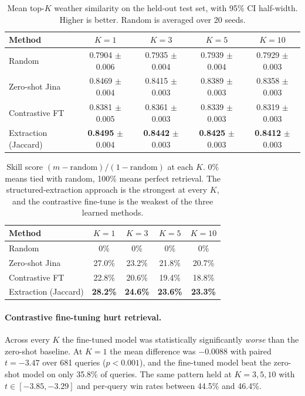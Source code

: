 \documentclass[11pt]{article}
\begin{document}
\begin{table}[h]
\centering
\begin{tabular}{lcccc}
\toprule
Method & \(K{=}1\) & \(K{=}3\) & \(K{=}5\) & \(K{=}10\) \\
\midrule
Random          & 0.7904 \(\pm\) 0.006 & 0.7935 \(\pm\) 0.004 & 0.7939 \(\pm\) 0.004 & 0.7929 \(\pm\) 0.003 \\
Zero-shot Jina  & 0.8469 \(\pm\) 0.004 & 0.8415 \(\pm\) 0.003 & 0.8389 \(\pm\) 0.003 & 0.8358 \(\pm\) 0.003 \\
Contrastive FT  & 0.8381 \(\pm\) 0.005 & 0.8361 \(\pm\) 0.003 & 0.8339 \(\pm\) 0.003 & 0.8319 \(\pm\) 0.003 \\
Extraction (Jaccard) & \textbf{0.8495} \(\pm\) 0.004 & \textbf{0.8442} \(\pm\) 0.003 & \textbf{0.8425} \(\pm\) 0.003 & \textbf{0.8412} \(\pm\) 0.003 \\
\bottomrule
\end{tabular}
\caption{Mean top-\(K\) weather similarity on the held-out test set, with 95\% CI half-width. Higher is better. Random is averaged over 20 seeds.}
\end{table}

\begin{table}[h]
\centering
\begin{tabular}{lcccc}
\toprule
Method & \(K{=}1\) & \(K{=}3\) & \(K{=}5\) & \(K{=}10\) \\
\midrule
Random          & 0\% & 0\% & 0\% & 0\% \\
Zero-shot Jina  & 27.0\% & 23.2\% & 21.8\% & 20.7\% \\
Contrastive FT  & 22.8\% & 20.6\% & 19.4\% & 18.8\% \\
Extraction (Jaccard) & \textbf{28.2\%} & \textbf{24.6\%} & \textbf{23.6\%} & \textbf{23.3\%} \\
\bottomrule
\end{tabular}
\caption{Skill score \((m - \mathrm{random})/(1 - \mathrm{random})\) at each \(K\). 0\% means tied with random, 100\% means perfect retrieval. The structured-extraction approach is the strongest at every \(K\), and the contrastive fine-tune is the weakest of the three learned methods.}
\end{table}

\paragraph{Contrastive fine-tuning hurt retrieval.}
Across every \(K\) the fine-tuned model was statistically significantly \emph{worse} than the zero-shot baseline. At \(K{=}1\) the mean difference was \(-0.0088\) with paired \(t = -3.47\) over 681 queries (\(p < 0.001\)), and the fine-tuned model beat the zero-shot model on only 35.8\% of queries. The same pattern held at \(K{=}3, 5, 10\) with \(t \in [-3.85, -3.29]\) and per-query win rates between 44.5\% and 46.4\%.
\end{document}

